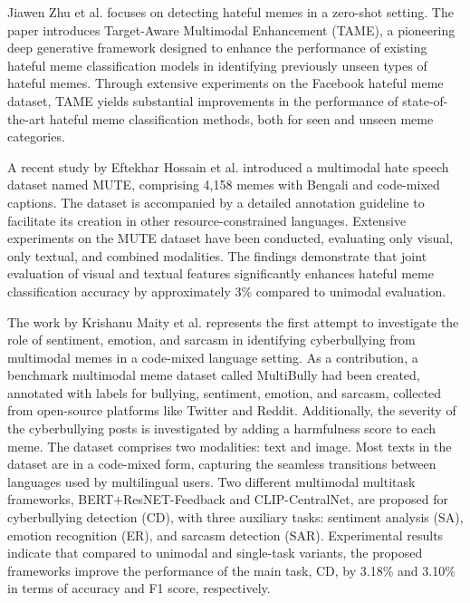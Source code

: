 \documentclass{ieeeaccess}
\begin{document}
Jiawen Zhu et al. \cite{b9} focuses on detecting hateful memes in a zero-shot setting. The paper introduces Target-Aware Multimodal Enhancement (TAME), a pioneering deep generative framework designed to enhance the performance of existing hateful meme classification models in identifying previously unseen types of hateful memes. Through extensive experiments on the Facebook hateful meme dataset, TAME yields substantial improvements in the performance of state-of-the-art hateful meme classification methods, both for seen and unseen meme categories.

A recent study by Eftekhar Hossain et al. \cite{b10} introduced a multimodal hate speech dataset named MUTE, comprising 4,158 memes with Bengali and code-mixed captions. The dataset is accompanied by a detailed annotation guideline to facilitate its creation in other resource-constrained languages. Extensive experiments on the MUTE dataset have been conducted, evaluating only visual, only textual, and combined modalities. The findings demonstrate that joint evaluation of visual and textual features significantly enhances hateful meme classification accuracy by approximately 3\% compared to unimodal evaluation.

The work by Krishanu Maity et al. \cite{b11} represents the first attempt to investigate the role of sentiment, emotion, and sarcasm in identifying cyberbullying from multimodal memes in a code-mixed language setting. As a contribution, a benchmark multimodal meme dataset called MultiBully had been created, annotated with labels for bullying, sentiment, emotion, and sarcasm, collected from open-source platforms like Twitter and Reddit. Additionally, the severity of the cyberbullying posts is investigated by adding a harmfulness score to each meme. The dataset comprises two modalities: text and image. Most texts in the dataset are in a code-mixed form, capturing the seamless transitions between languages used by multilingual users. Two different multimodal multitask frameworks, BERT+ResNET-Feedback and CLIP-CentralNet, are proposed for cyberbullying detection (CD), with three auxiliary tasks: sentiment analysis (SA), emotion recognition (ER), and sarcasm detection (SAR). Experimental results indicate that compared to unimodal and single-task variants, the proposed frameworks improve the performance of the main task, CD, by 3.18\% and 3.10\% in terms of accuracy and F1 score, respectively.
\end{document}
